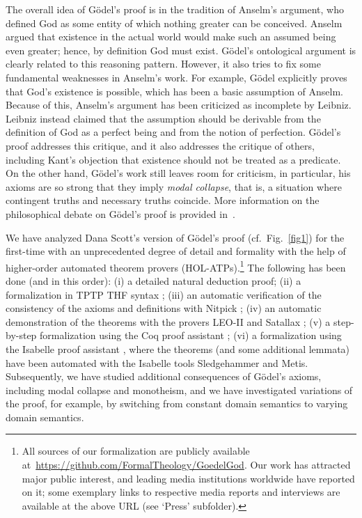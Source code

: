 \documentclass{ecai2014}
\begin{document}
The overall idea of G{\"o}del's proof is in the tradition of Anselm's
argument, who defined God as some entity of which nothing greater can be
conceived. Anselm argued that existence in the actual world would
make such an assumed being even greater; hence, by definition God must
exist. G{\"o}del's ontological argument is clearly related to this
reasoning pattern. However, it also tries to fix some fundamental
weaknesses in Anselm's work. For example, G{\"o}del explicitly proves
that God's existence is possible, which has been a basic assumption of
Anselm. Because of this, Anselm's argument has been
criticized as incomplete by Leibniz. Leibniz instead claimed that the
assumption should be derivable from the definition of God as a perfect
being and from the notion of perfection.  G{\"o}del's proof 
addresses this critique, and it also addresses the critique of others,
including Kant's objection that existence should not be treated as a predicate. On the other hand, G{\"o}del's work
still leaves room for criticism, in particular, his axioms are so
strong that they imply \emph{modal collapse}, that is, a situation where
contingent truths and necessary
truths coincide. More information on the philosophical debate on
G{\"o}del's proof is provided in~\cite{sobel2004logic}.


We have analyzed Dana Scott's version of G\"{o}del's proof
\cite{ScottNotes} (cf.~Fig.~\ref{fig1}) for the first-time with an
unprecedented degree of detail and formality with the help of
higher-order automated theorem provers (HOL-ATPs).\footnote{All
  sources of our formalization are publicly available
  at~\url{https://github.com/FormalTheology/GoedelGod}. Our work has
  attracted major public interest, and leading media institutions
  worldwide have reported on it; some exemplary links to respective
  media reports and interviews are available at the above URL (see
  `Press' subfolder).}  The following has been done (and in this
order):
(i) a detailed natural deduction proof;
%
(ii) a formalization in TPTP THF syntax \cite{J22};
%
(iii) an automatic verification of the consistency of the axioms and 
definitions with Nitpick \cite{Nitpick};
%
(iv) an automatic demonstration of the theorems with the provers LEO-II \cite{LEO-II} and Satallax \cite{Satallax};
%
(v) a step-by-step formalization using the Coq proof assistant \cite{Coq};
%
(vi) a formalization using the Isabelle proof assistant \cite{Isabelle}, where the
theorems (and some additional lemmata) have been automated with the
Isabelle tools Sledgehammer %
and Metis. %
Subsequently, we have studied additional consequences
of G\"odel's axioms, including modal collapse and monotheism, and we
have investigated variations of the proof, for example, by switching
from constant domain semantics to varying domain semantics.
\end{document}
